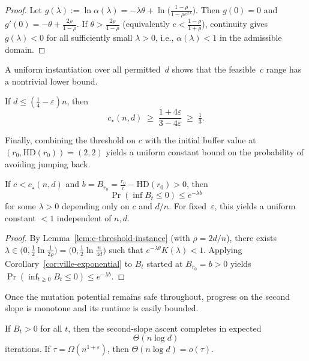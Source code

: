 \begin{proof}
	Let $g(\lambda):=\ln\alpha(\lambda)=-\lambda\theta+\ln\!\big(\tfrac{1-\rho}{1-\rho e^{2\lambda}}\big)$. 
	Then $g(0)=0$ and $g'(0)=-\theta+\tfrac{2\rho}{1-\rho}$. 
	If $\theta>\tfrac{2\rho}{1-\rho}$ (equivalently $c<\tfrac{1-\rho}{1+\rho}$), continuity gives $g(\lambda)<0$ for all sufficiently small $\lambda>0$, i.e., $\alpha(\lambda)<1$ in the admissible domain.
\end{proof}

A uniform instantiation over all permitted~$d$ shows that the feasible~$c$ 
range has a nontrivial lower bound.

\begin{corollary}%
	If $d\le (\tfrac14-\varepsilon)n$, then
	\[
	c_\star(n,d) \;\ge\; \frac{1+4\varepsilon}{3-4\varepsilon} \;\ge\; \tfrac13.
	\]
\end{corollary}
\label{cor:c-floor}



Finally, combining the threshold on $c$ with the initial buffer value at 
$(r_0,\mathrm{HD}(r_0))=(2,2)$ yields a uniform constant bound on the 
probability of avoiding jumping back.

\begin{lemma}
	\label{lem:param-constant-c-general}
	If $c<c_\star(n,d)$ and 
	$b=B_{r_0}=\frac{r_0}{c}-\mathrm{HD}(r_0)>0$, 
	then 
	\[
	\Pr\!\left(\inf B_t \le 0\right) \le e^{-\lambda b}
	\]
	for some $\lambda>0$ depending only on $c$ and $d/n$.  
	For fixed~$\varepsilon$, this yields a uniform constant $<1$ independent of 
	$n,d$.
\end{lemma}

\begin{proof}
	By Lemma~\ref{lem:c-threshold-instance} (with $\rho=2d/n$), there exists
	$\lambda\in\big(0,\tfrac12\ln\tfrac{1}{2\rho}\big)=\big(0,\tfrac12\ln\tfrac{n}{4d}\big)$
	such that $e^{-\lambda\theta}K(\lambda)<1$. Applying Corollary~\ref{cor:ville-exponential}
	to $B_t$ started at $B_{r_0}=b>0$ yields
	$\Pr(\inf_{t\ge 0} B_t\le 0)\le e^{-\lambda b}$.
\end{proof}

Once the mutation potential remains safe throughout, progress on the second 
slope is monotone and its runtime is easily bounded.



\begin{lemma}%
	\label{prop:climb-time}
	
	If $B_t>0$ for all $t$, then the second-slope ascent completes in expected
	\[
	\Theta(n\log d)
	\]
	iterations.  
	If $\tau=\Omega(n^{1+\varepsilon})$, then $\Theta(n\log d)=o(\tau)$.
\end{lemma}

